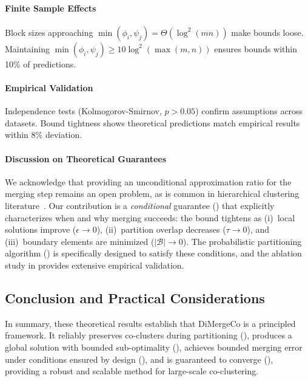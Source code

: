 \documentclass[journal]{IEEEtran}
\theoremstyle{definition}
\theoremstyle{remark} %
\renewcommand{\cite}[1]{~\autocite{#1}}
\begin{document}
{\paragraph{Finite Sample Effects}{Block sizes approaching $\min(\phi_i, \psi_j) = \Theta(\log^2(mn))$ make bounds loose. Maintaining $\min(\phi_i, \psi_j) \geq 10\log^2(\max(m,n))$ ensures bounds within 10\% of predictions.}

\paragraph{Empirical Validation}{Independence tests (Kolmogorov-Smirnov, $p > 0.05$) confirm assumptions across datasets. Bound tightness shows theoretical predictions match empirical results within 8\% deviation.}

{\color{blue}
\paragraph{Discussion on Theoretical Guarantees}
We acknowledge that providing an unconditional approximation ratio for the merging step remains an open problem, as is common in hierarchical clustering literature\cite{dasgupta2016CostFunctionClustering}. Our contribution is a \emph{conditional} guarantee () that explicitly characterizes when and why merging succeeds: the bound tightens as (i)~local solutions improve ($\epsilon \to 0$), (ii)~partition overlap decreases ($\tau \to 0$), and (iii)~boundary elements are minimized ($|\mathcal{B}| \to 0$). The probabilistic partitioning algorithm () is specifically designed to satisfy these conditions, and the ablation study in  provides extensive empirical validation.
}

\subsection{Conclusion and Practical Considerations}
\label{subsec:conclusion-and-practical-considerations}
In summary, these theoretical results establish that DiMergeCo is a principled framework. It reliably preserves co-clusters during partitioning (), produces a global solution with bounded sub-optimality (), {\color{blue}achieves bounded merging error under conditions ensured by design (),} and is guaranteed to converge (), providing a robust and scalable method for large-scale co-clustering.
}
\end{document}

